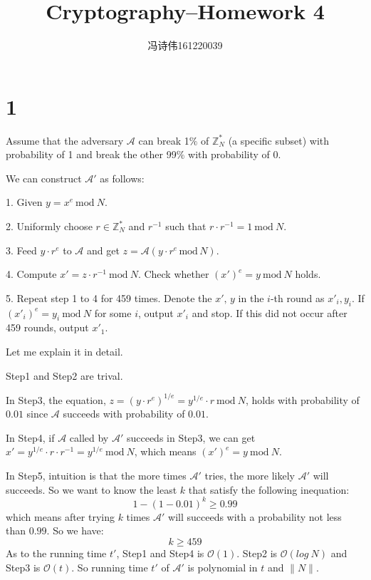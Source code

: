 \documentclass[a4papers]{ctexart}
\title{Cryptography--Homework 4}
\author{冯诗伟161220039}
\date{}
\newcommand{\mc}[1]{\mathcal{#1}}
\newcommand{\mr}[1]{\ \mathrm{#1}\ }
\begin{document}
\maketitle
\section*{1}
Assume that the adversary $\mathcal{A}$ can break 1$\%$ of $\mathbb{Z}_N^*$ (a specific subset)
with probability of 1 and break the other 99$\%$ with probability of 0.
 
We can construct $\mathcal{A'}$ as follows:

1. Given $y=x^e \mr{mod} N$.

2. Uniformly choose $r \in \mathbb{Z}_N^*$ and $r^{-1}$ such that $r\cdot r^{-1} = 1 \mr{mod} N$.

3. Feed $y\cdot r^e$ to $\mathcal{A}$ and get $z = \mathcal{A}(y\cdot r^e\, \mathrm{mod}\, N)$.

4. Compute $x' = z\cdot r^{-1} \mr{mod} N$. Check whether $(x')^e = y \mr{mod} N$ holds.

5. Repeat step 1 to 4 for 459 times.
 Denote the $x',\, y $ in the $i$-th round as $x'_i, y_i$.
If $(x'_i)^e = y_i \mr{mod} N$ for some $i$, output $x'_i$ and stop. 
If this did not occur after 459 rounds, output $x'_1$.

Let me explain it in detail.

Step1 and Step2 are trival.

In Step3, the equation, $z=(y\cdot r^e)^{1/e}= y^{1/e}\cdot r \mr{mod} N$, holds with probability of $0.01$ since $\mc{A}$ succeeds with probability of $0.01$.

In Step4, if $\mc{A}$ called by $\mc{A'}$ succeeds in Step3, we can get $x' = y^{1/e}\cdot r\cdot r^{-1} = y^{1/e} \mr{mod} N$, which means $(x')^e = y \mr{mod} N$.

In Step5,
intuition is that the more times $\mc{A'}$ tries, the more likely $\mc{A'}$ will succeeds. 
So we want to know the least $k$ that satisfy the following inequation:
\[ 1- (1-0.01)^k \ge 0.99\]
which means after trying $k$ times $\mc{A'}$ will succeeds with a probability not less than $0.99$.
So we have:\[ k \ge 459\]
As to the running time $t'$, Step1 and Step4 is $\mc{O}(1)$. Step2 is $\mc{O}(log\ N)$ and Step3 is $\mc{O}(t)$.
So running time $t'$ of $\mc{A'}$ is polynomial in $t$ and $\lVert N \rVert$.
\end{document}
